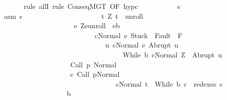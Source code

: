 \begin{isabellebody}
\ \ \ \ \ \ \isamarkupfalse%
\ {\isacharparenleft}rule\ allI{\isacharcomma}\ rule\ ConseqMGT\ {\isacharbrackleft}OF\ hyp{\isacharunderscore}c{\isacharbrackright}{\isacharparenright}\isanewline
\ \ \ \ \ \ \ \ \isamarkupfalse%
\ {\isasymtau}\ s\isanewline
\ \ \ \ \ \ \ \ \isamarkupfalse%
\ \ asm{\isacharcolon}\ {\isachardoublequoteopen}s{\isasymin}\ {\isacharbraceleft}{\isasymtau}{\isacharbraceright}\ {\isasyminter}\ \isanewline
\ \ \ \ \ \ \ \ \ \ \ \ \ \ \ \ \ \ \ {\isacharbraceleft}t{\isachardot}\ {\isacharparenleft}Z{\isacharcomma}\ t{\isacharparenright}\ {\isasymin}\ {\isacharquery}unroll\ {\isasymand}\ \isanewline
\ \ \ \ \ \ \ \ \ \ \ \ \ \ \ \ \ \ \ \ \ \ {\isacharparenleft}{\isasymforall}e{\isachardot}\ {\isacharparenleft}Z{\isacharcomma}e{\isacharparenright}{\isasymin}{\isacharquery}unroll\ {\isasymlongrightarrow}\ e{\isasymin}b\isanewline
\ \ \ \ \ \ \ \ \ \ \ \ \ \ \ \ \ \ \ \ \ \ \ \ \ \ \ {\isasymlongrightarrow}\ {\isasymGamma}{\isasymturnstile}{\isasymlangle}c{\isacharcomma}Normal\ e{\isasymrangle}\ {\isasymRightarrow}{\isasymnotin}{\isacharparenleft}{\isacharbraceleft}Stuck{\isacharbraceright}\ {\isasymunion}\ Fault\ {\isacharbackquote}\ {\isacharparenleft}{\isacharminus}F{\isacharparenright}{\isacharparenright}\ {\isasymand}\ \isanewline
\ \ \ \ \ \ \ \ \ \ \ \ \ \ \ \ \ \ \ \ \ \ \ \ \ \ \ \ \ \ \ {\isacharparenleft}{\isasymforall}u{\isachardot}\ {\isasymGamma}{\isasymturnstile}{\isasymlangle}c{\isacharcomma}Normal\ e{\isasymrangle}\ {\isasymRightarrow}Abrupt\ u\ {\isasymlongrightarrow}\ \isanewline
\ \ \ \ \ \ \ \ \ \ \ \ \ \ \ \ \ \ \ \ \ \ \ \ \ \ \ \ \ \ \ \ \ \ \ \ {\isasymGamma}{\isasymturnstile}{\isasymlangle}While\ b\ c{\isacharcomma}Normal\ Z{\isasymrangle}\ {\isasymRightarrow}\ Abrupt\ u{\isacharparenright}{\isacharparenright}\ {\isasymand}\isanewline
\ \ \ \ \ \ \ \ \ \ \ \ \ \ \ \ \ \ \ \ \ {\isasymGamma}{\isasymturnstile}Call\ p{\isasymdown}\ Normal\ {\isasymsigma}\ {\isasymand}\isanewline
\ \ \ \ \ \ \ \ \ \ \ \ \ \ \ \ \ \ \ \ \ {\isacharparenleft}{\isasymexists}c{\isacharprime}{\isachardot}\ {\isasymGamma}{\isasymturnstile}{\isacharparenleft}Call\ p{\isacharcomma}Normal\ {\isasymsigma}{\isacharparenright}\ {\isasymrightarrow}\isactrlsup {\isacharplus}\ \isanewline
\ \ \ \ \ \ \ \ \ \ \ \ \ \ \ \ \ \ \ \ \ \ \ \ \ \ \ \ \ \ \ \ \ \ {\isacharparenleft}c{\isacharprime}{\isacharcomma}Normal\ t{\isacharparenright}\ {\isasymand}\ While\ b\ c\ {\isasymin}\ redexes\ c{\isacharprime}{\isacharparenright}{\isacharbraceright}\isanewline
\ \ \ \ \ \ \ \ \ \ \ \ \ \ \ \ \ \ \ {\isasyminter}\ b{\isachardoublequoteclose}\isanewline

\end{isabellebody}
